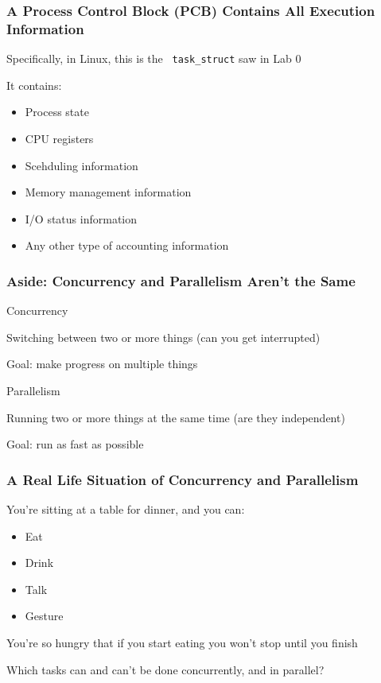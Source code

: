   \begin{frame}
    \frametitle{A Process Control Block (PCB) Contains All Execution Information}


    Specifically, in Linux, this is the \texttt{\color{primarycolor}
    task\_struct} saw in Lab 0

    \vspace{2em}

    It contains:
    \begin{itemize}
      \item Process state
      \item CPU registers
      \item Scehduling information
      \item Memory management information
      \item I/O status information
      \item Any other type of accounting information
    \end{itemize}
  \end{frame}

  \begin{frame}
    \frametitle{Aside: Concurrency and Parallelism Aren't the Same}

    Concurrency

    \hspace{2em} Switching between two or more things (can you get interrupted)

    \hspace{4em} Goal: make progress on multiple things

    \vspace{4em}

    Parallelism

    \hspace{2em} Running two or more things at the same time (are they independent)

    \hspace{4em} Goal: run as fast as possible
  \end{frame}

  \begin{frame}
    \frametitle{A Real Life Situation of Concurrency and Parallelism}


    You're sitting at a table for dinner, and you can:
    \begin{itemize}
      \item Eat
      \item Drink
      \item Talk
      \item Gesture
    \end{itemize}
    You're so hungry that if you start eating you won't stop until you finish

    \vspace{4em}

    Which tasks can and can't be done concurrently, and in parallel?
  \end{frame}

